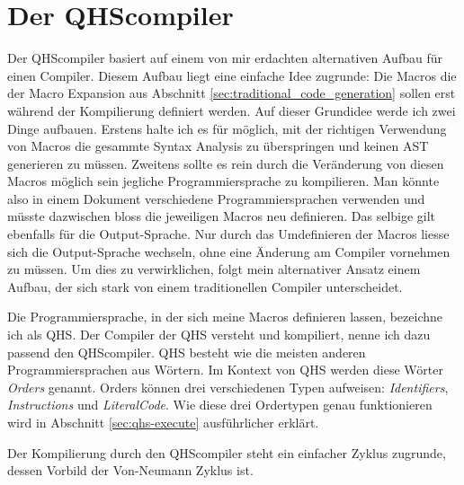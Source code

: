 \chapter{Der QHScompiler} \label{cha:4-QHS_Compiler}
Der QHScompiler basiert auf einem von mir erdachten alternativen Aufbau für einen Compiler. Diesem Aufbau liegt eine einfache Idee zugrunde:
Die Macros die der Macro Expansion aus Abschnitt \ref{sec:traditional_code_generation} sollen erst während der Kompilierung definiert werden. 
Auf dieser Grundidee werde ich zwei Dinge aufbauen. Erstens halte ich es für möglich, mit der richtigen Verwendung von Macros die gesammte Syntax Analysis zu überspringen und keinen AST generieren zu müssen.
Zweitens sollte es rein durch die Veränderung von diesen Macros möglich sein jegliche Programmiersprache zu kompilieren. Man könnte also in einem Dokument verschiedene Programmiersprachen verwenden und
müsste dazwischen bloss die jeweiligen Macros neu definieren. Das selbige gilt ebenfalls für die Output-Sprache.
Nur durch das Umdefinieren der Macros liesse sich die Output-Sprache wechseln, ohne eine Änderung am Compiler vornehmen zu müssen.
Um dies zu verwirklichen, folgt mein alternativer Ansatz einem Aufbau, der sich stark von einem traditionellen Compiler unterscheidet.

Die Programmiersprache, in der sich meine Macros definieren lassen, bezeichne ich als QHS. Der Compiler der QHS versteht und kompiliert, nenne ich dazu passend den QHScompiler.
QHS besteht wie die meisten anderen Programmiersprachen aus Wörtern. Im Kontext von QHS werden diese Wörter \textit{Orders} genannt.
Orders können drei verschiedenen Typen aufweisen: \textit{Identifiers}, \textit{Instructions} und \textit{LiteralCode}.
Wie diese drei Ordertypen genau funktionieren wird in Abschnitt \ref{sec:qhs-execute} ausführlicher erklärt.

Der Kompilierung durch den QHScompiler steht ein einfacher Zyklus zugrunde, dessen Vorbild der Von-Neumann Zyklus ist.

